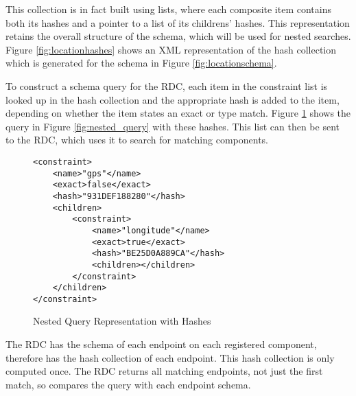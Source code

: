 \documentclass[12pt,twoside,notitlepage]{report}
\begin{document}
This collection is in fact built using lists, where each composite item contains both its hashes and a pointer to a list of its childrens' hashes.
This representation retains the overall structure of the schema, which will be used for nested searches. 
Figure \ref{fig:locationhashes} shows an XML representation of the hash collection which is generated for the schema in Figure \ref{fig:locationschema}.


To construct a schema query for the RDC, each item in the constraint list is looked up in the hash collection and the appropriate hash is added to the item, depending on whether the item states an exact or type match. 
Figure \ref{fig:nested_query_hash} shows the query in Figure \ref{fig:nested_query} with these hashes. 
This list can then be sent to the RDC, which uses it to search for matching components. 

\begin{figure}
\begin{lstlisting}[style=xml]
<constraint>
	<name>"gps"</name>
	<exact>false</exact>
	<hash>"931DEF188280"</hash>
	<children>
		<constraint>
			<name>"longitude"</name>
			<exact>true</exact>
			<hash>"BE25D0A889CA"</hash>
			<children></children>
		</constraint>
	</children>
</constraint>
\end{lstlisting}
\caption{Nested Query Representation with Hashes}
\label{fig:nested_query_hash}
\end{figure}

The RDC has the schema of each endpoint on each registered component, therefore has the hash collection of each endpoint. 
This hash collection is only computed once. 
The RDC returns all matching endpoints, not just the first match, so compares the query with each endpoint schema. 
\end{document}
